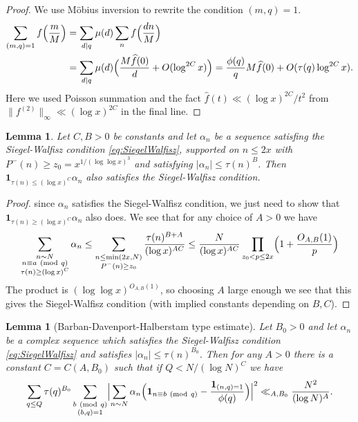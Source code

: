 \documentclass[10pt]{amsart}
\theoremstyle{plain}
\newtheorem{lmm}[thrm]{Lemma}
\numberwithin{equation}{section}
\newcommand{\Mod}[1]{\ (\mathrm{mod}\ #1)}
\renewcommand{\hat}[1]{\widehat #1}
\begin{document}
%
%
%
%
\begin{proof}
We use M\"obius inversion to rewrite the condition $(m,q)=1$.
\begin{align*}
\sum_{(m,q)=1}f\Bigl(\frac{m}{M}\Bigr)&=\sum_{d|q}\mu(d)\sum_{n}f\Bigl(\frac{d n}{M}\Bigr)\\
&=\sum_{d|q}\mu(d)\Bigl(\frac{M\hat{f}(0)}{d}+O(\log^{2C}{x})\Bigr)=\frac{\phi(q)}{q}M\hat{f}(0)+O(\tau(q)\log^{2C}{x}).
\end{align*}
Here we used Poisson summation and the fact $\hat{f}(t)\ll (\log{x})^{2C}/t^2$ from $\|f^{(2)}\|_\infty \ll (\log{x})^{2C}$ in the final line.
\end{proof}
%
%
%
%
%
%
%
%
\begin{lmm}\label{lmm:SiegelWalfiszMaintain}
Let $C,B>0$ be constants and let $\alpha_n$ be a sequence satisfing the Siegel-Walfisz condition \eqref{eq:SiegelWalfisz}, supported on $n\le 2x$ with $P^-(n)\ge z_0=x^{1/(\log\log{x})^3}$ and satisfying $|\alpha_n|\le \tau(n)^B$. Then $\mathbf{1}_{\tau(n)\le (\log{x})^C}\alpha_n$ also satisfies the Siegel-Walfisz condition.
\end{lmm}
%
%
%
%
\begin{proof}
since $\alpha_n$ satisfies the Siegel-Walfisz condition, we just need to show that $\mathbf{1}_{\tau(n)\ge(\log{x})^C}\alpha_n$ also does. We see that for any choice of $A>0$ we have
\begin{align*}
\sum_{\substack{n\sim N\\ n\equiv a\Mod{q}\\ \tau(n)\ge (\log{x})^C}}\alpha_n\le \sum_{\substack{n\le \min(2x,N) \\ P^-(n)\ge z_0}}\frac{\tau(n)^{B+A}}{(\log{x})^{AC}}\le \frac{N}{(\log{x})^{AC}}\prod_{z_0<p\le 2x}\Bigl(1+\frac{O_{A,B}(1)}{p}\Bigr)
\end{align*}
The product is $(\log\log{x})^{O_{A,B}(1)}$, so choosing $A$ large enough we see that this gives the Siegel-Walfisz condition (with implied constants depending on $B,C$).
\end{proof}
%
%
%
%
%
%
%
%
\begin{lmm}[Barban-Davenport-Halberstam type estimate]\label{lmm:BarbanDavenportHalberstam}
Let $B_0>0$ and let $\alpha_n$ be a complex sequence which satisfies the Siegel-Walfisz condition \eqref{eq:SiegelWalfisz} and satisfies $|\alpha_n|\le \tau(n)^{B_0}$. Then for any $A>0$ there is a constant $C=C(A,B_0)$ such that if $Q<N/(\log{N})^{C}$ we have
\[
\sum_{q\le Q}\tau(q)^{B_0}\sum_{\substack{b\Mod{q}\\ (b,q)=1}}\Bigl|\sum_{n\sim N}\alpha_n \Bigl(\mathbf{\mathbf{1}}_{n\equiv b\Mod{q}}-\frac{\mathbf{1}_{(n,q)=1}}{\phi(q)}\Bigr)\Bigr|^2\ll_{A,B_0} \frac{N^2}{(\log{N})^A}.
\]
\end{lmm}
\end{document}
